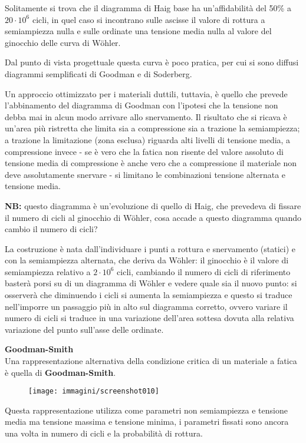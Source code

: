 \documentclass{article}
\begin{document}
\begin{adjustwidth}{2in}{}
			Solitamente si trova che il diagramma di Haig base ha un'affidabilità del 50\% a $20\cdot10^6$ cicli, in quel caso si incontrano sulle ascisse il valore di rottura a semiampiezza nulla e sulle ordinate una tensione media nulla al valore del ginocchio delle curva di Wöhler. 
			
			Dal punto di vista progettuale questa curva è poco pratica, per cui si sono diffusi diagrammi semplificati di Goodman e di Soderberg. 
			
			Un approccio ottimizzato per i materiali duttili, tuttavia, è quello che prevede l'abbinamento del diagramma di Goodman con l'ipotesi che la tensione non debba mai in alcun modo arrivare allo snervamento. Il risultato che si ricava è un'area più ristretta che limita sia a compressione sia a trazione la semiampiezza; a trazione la limitazione (zona esclusa) riguarda alti livelli di tensione media, a compressione invece - se è vero che la fatica non risente del valore assoluto di tensione media di compressione è anche vero che a compressione il materiale non deve assolutamente snervare - si limitano le combinazioni tensione alternata e tensione media. \newline
			
			\textbf{NB:} questo diagramma è un'evoluzione di quello di Haig, che prevedeva di fissare il numero di cicli al ginocchio di Wöhler, cosa accade a questo diagramma quando cambio il numero di cicli? 
			
			La costruzione è nata dall'individuare i punti a rottura e snervamento (statici) e con la semiampiezza alternata, che deriva da Wöhler: il ginocchio è il valore di semiampiezza relativo a $2\cdot10^6$ cicli, cambiando il numero di cicli di riferimento basterà porsi su di un diagramma di Wöhler e vedere quale sia il nuovo punto: si osserverà che diminuendo i cicli si aumenta la semiampiezza e questo si traduce nell'imporre un passaggio più in alto sul diagramma corretto, ovvero variare il numero di cicli si traduce in una variazione dell'area sottesa dovuta alla relativa variazione del punto sull'asse delle ordinate. \newline
			
			
			{\large \textbf{Goodman-Smith}}\\
			Una rappresentazione alternativa della condizione critica di un materiale a fatica è quella di \textbf{Goodman-Smith}.
\begin{figure}[H]
	\centering
	\label{fig:screenshot010}
	\texttt{[image: immagini/screenshot010]}
\end{figure}			
			Questa rappresentazione utilizza come parametri non semiampiezza e tensione media ma tensione massima e tensione minima, i parametri fissati sono ancora una volta in numero di cicli e la probabilità di rottura. 
			

\end{adjustwidth}
\end{document}
